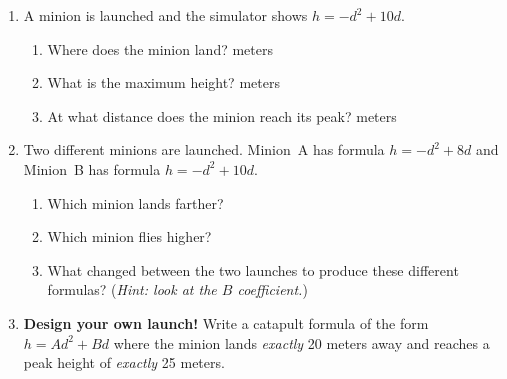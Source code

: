 \documentclass[12pt]{article}
\newcommand{\blank}[1][4cm]{\underline{\hspace{#1}}}
\begin{document}
\begin{enumerate}[leftmargin=*, label=\textbf{\arabic*.}, resume]

\item A minion is launched and the simulator shows $h = -d^2 + 10d$.

  \begin{enumerate}[label=(\alph*)]
    \item Where does the minion land? \blank[3cm] meters

    \vspace{4pt}
    \item What is the maximum height? \blank[3cm] meters

    \vspace{4pt}
    \item At what distance does the minion reach its peak? \blank[3cm] meters
  \end{enumerate}

  \begin{workbox}
  \vspace{3cm}
  \end{workbox}

\vspace{8pt}
\item Two different minions are launched.  Minion~A has formula
  $h = -d^2 + 8d$ and Minion~B has formula $h = -d^2 + 10d$.
  \begin{enumerate}[label=(\alph*)]
    \item Which minion lands farther? \blank[3cm]
    \vspace{4pt}
    \item Which minion flies higher? \blank[3cm]
    \vspace{4pt}
    \item What changed between the two launches to produce these
          different formulas?  (\textit{Hint: look at the $B$ coefficient.})

      \begin{workbox}
      \vspace{2cm}
      \end{workbox}
  \end{enumerate}

\vspace{8pt}
\item \textbf{Design your own launch!}
  Write a catapult formula of the form $h = Ad^2 + Bd$ where the minion
  lands \emph{exactly} 20 meters away and reaches a peak height of
  \emph{exactly} 25 meters.


\end{enumerate}
\end{document}
